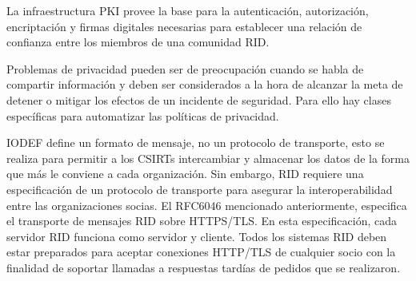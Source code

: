 La infraestructura PKI provee la base para la autenticación, autorización, 
encriptación y firmas digitales necesarias para establecer una relación de 
confianza entre los miembros de una comunidad RID.

Problemas de privacidad pueden ser de preocupación cuando se habla de compartir 
información y deben ser considerados a la hora de alcanzar la meta de detener o 
mitigar los efectos de un incidente de seguridad. Para ello hay clases 
específicas para automatizar las políticas de privacidad.

IODEF define un formato de mensaje, no un protocolo de transporte, esto se 
realiza para permitir a los CSIRTs intercambiar y almacenar los datos de la 
forma que más le conviene a cada organización. Sin embargo, RID requiere una 
especificación de un protocolo de transporte para asegurar la interoperabilidad 
entre las organizaciones socias. El RFC6046 mencionado anteriormente, especifica 
el transporte de mensajes RID sobre HTTPS/TLS. En esta especificación, cada 
servidor RID funciona como servidor y cliente. Todos los sistemas RID deben 
estar preparados para aceptar conexiones HTTP/TLS de cualquier socio con la 
finalidad de soportar llamadas a respuestas tardías de pedidos que se 
realizaron.












